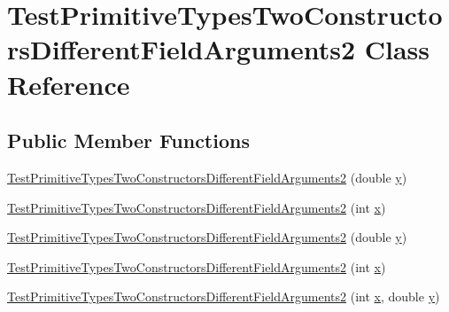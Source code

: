 \hypertarget{classTestPrimitiveTypesTwoConstructorsDifferentFieldArguments2}{
\section{TestPrimitiveTypesTwoConstructorsDifferentFieldArguments2 Class Reference}
\label{classTestPrimitiveTypesTwoConstructorsDifferentFieldArguments2}
}
\subsection*{Public Member Functions}
\begin{DoxyCompactItemize}
\item 
\hyperlink{classTestPrimitiveTypesTwoConstructorsDifferentFieldArguments2_a0d692176317889c0bd07408db128cf9e}{TestPrimitiveTypesTwoConstructorsDifferentFieldArguments2} (double \hyperlink{classTestPrimitiveTypesTwoConstructorsDifferentFieldArguments2_a1022b1a98ab1e4b04e7a1647d4f4f542}{y})
\item 
\hyperlink{classTestPrimitiveTypesTwoConstructorsDifferentFieldArguments2_a18282a52055356278816e6202aaac609}{TestPrimitiveTypesTwoConstructorsDifferentFieldArguments2} (int \hyperlink{classTestPrimitiveTypesTwoConstructorsDifferentFieldArguments2_ae9b62cc07987a2b7d2ad99d31b53e3e2}{x})
\item 
\hyperlink{classTestPrimitiveTypesTwoConstructorsDifferentFieldArguments2_a0d692176317889c0bd07408db128cf9e}{TestPrimitiveTypesTwoConstructorsDifferentFieldArguments2} (double \hyperlink{classTestPrimitiveTypesTwoConstructorsDifferentFieldArguments2_a1022b1a98ab1e4b04e7a1647d4f4f542}{y})
\item 
\hyperlink{classTestPrimitiveTypesTwoConstructorsDifferentFieldArguments2_a18282a52055356278816e6202aaac609}{TestPrimitiveTypesTwoConstructorsDifferentFieldArguments2} (int \hyperlink{classTestPrimitiveTypesTwoConstructorsDifferentFieldArguments2_ae9b62cc07987a2b7d2ad99d31b53e3e2}{x})
\item 
\hyperlink{classTestPrimitiveTypesTwoConstructorsDifferentFieldArguments2_a868e8c1330c202b1eacb05e39ec7a113}{TestPrimitiveTypesTwoConstructorsDifferentFieldArguments2} (int \hyperlink{classTestPrimitiveTypesTwoConstructorsDifferentFieldArguments2_ae9b62cc07987a2b7d2ad99d31b53e3e2}{x}, double \hyperlink{classTestPrimitiveTypesTwoConstructorsDifferentFieldArguments2_a1022b1a98ab1e4b04e7a1647d4f4f542}{y})
\end{DoxyCompactItemize}
